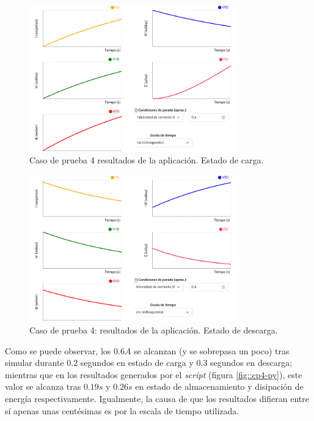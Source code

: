 \documentclass[../main.tex]{subfiles}
\begin{document}
\begin{figure}[!h]
    \centering
    \includegraphics[width=0.8\textwidth]{images/cp4-1.png}
    \caption{Caso de prueba 4 resultados de la aplicación. Estado de carga.}
    \label{fig::cp4-app}
\end{figure}

\begin{figure}[!h]
    \centering
    \includegraphics[width=0.8\textwidth]{images/cp4-1.1.png}
    \caption{Caso de prueba 4: resultados de la aplicación. Estado de descarga.}
    \label{fig::cp4.1-app}
\end{figure}



Como se puede observar, los $0.6A$ se alcanzan (y se sobrepasa un poco) tras simular durante $0.2$ segundos en estado de carga y $0.3$ segundos en descarga; mientras que en los resultados generados por el \textit{script} (figura \ref{fig::cp4-py}), este valor se alcanza tras $0.19s$ y $0.26s$ en estado de almacenamiento y disipación de energía respectivamente. Igualmente, la causa de que los resultados difieran entre sí apenas unas centésimas es por la escala de tiempo utilizada.\\ 
\end{document}
